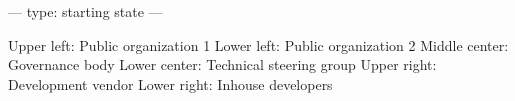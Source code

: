 ---
type: starting state
---

Upper left: Public organization 1
Lower left: Public organization 2
Middle center: Governance body
Lower center: Technical steering group
Upper right: Development vendor
Lower right: Inhouse developers
